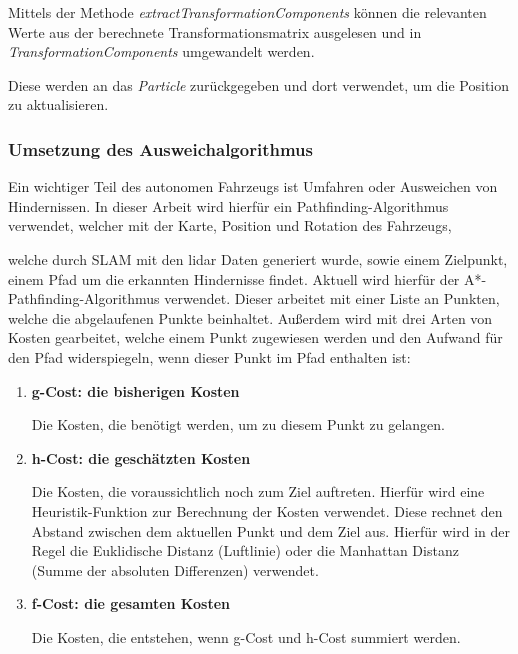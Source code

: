 Mittels der Methode \textit{extractTransformationComponents} können die relevanten Werte aus der berechnete Transformationsmatrix ausgelesen
und in \textit{TransformationComponents} umgewandelt werden.

Diese werden an das \textit{Particle} zurückgegeben und dort verwendet, um die Position zu aktualisieren.

\subsubsection{Umsetzung des Ausweichalgorithmus}

Ein wichtiger Teil des autonomen Fahrzeugs ist Umfahren oder Ausweichen von Hindernissen. 
In dieser Arbeit wird hierfür ein Pathfinding-Algorithmus verwendet, welcher mit der Karte, Position und Rotation des Fahrzeugs, 

welche durch SLAM mit den \ac{lidar} Daten generiert wurde, sowie einem Zielpunkt, einem Pfad um die erkannten Hindernisse findet. 
Aktuell wird hierfür der A*-Pathfinding-Algorithmus verwendet. Dieser arbeitet mit einer Liste an Punkten, welche die abgelaufenen Punkte beinhaltet. 
Außerdem wird mit drei Arten von Kosten gearbeitet, welche einem Punkt zugewiesen werden und den Aufwand für den Pfad widerspiegeln, 
wenn dieser Punkt im Pfad enthalten ist:

\begin{enumerate}[leftmargin=*]

\item \textbf{g-Cost: die bisherigen Kosten}

Die Kosten, die benötigt werden, um zu diesem Punkt zu gelangen. 

\item \textbf{h-Cost: die geschätzten Kosten}

Die Kosten, die voraussichtlich noch zum Ziel auftreten. Hierfür wird eine Heuristik-Funktion zur Berechnung der Kosten verwendet. 
Diese rechnet den Abstand zwischen dem aktuellen Punkt und dem Ziel aus. 
Hierfür wird in der Regel die Euklidische Distanz (Luftlinie) oder die Manhattan Distanz (Summe der absoluten Differenzen) verwendet. 

\item \textbf{f-Cost: die gesamten Kosten}

Die Kosten, die entstehen, wenn g-Cost und h-Cost summiert werden. 

\end{enumerate}

